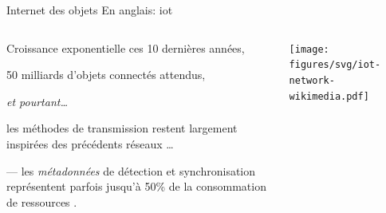 \documentclass[../main.tex]{subfiles}
\begin{document}
\begin{frame}{Internet des objets}
  {En anglais: \acrfull{iot}}
  \begin{columns}
    \begin{column}{.55\linewidth}
      \begin{overlayarea}{\linewidth}{.6\textheight}
        \begin{ctrlitemize}{5pt}
          \item Croissance exponentielle ces 10 dernières années,
          \item 50 milliards d'objets connectés attendus,
        \end{ctrlitemize}

        \hspace{7 em} \emph{et pourtant\dots}

        \begin{ctrlitemize}{2pt}
          \item les méthodes de transmission restent largement inspirées des précédents réseaux \dots
          \item [---] {\scriptsize les \emph{métadonnées} de détection et synchronisation représentent parfois jusqu'à  50\% de la consommation de ressources \cite{durisiMassiveUltrareliableLowLatency2016}.}
        \end{ctrlitemize}
      \end{overlayarea}
    \end{column}
    \begin{column}{.4\linewidth}
      \begin{center}
        \texttt{[image: figures/svg/iot-network-wikimedia.pdf]}
      \end{center}
    \end{column}
  \end{columns}
\end{frame}
\end{document}
